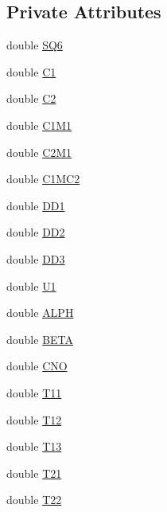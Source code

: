 \subsection*{Private Attributes}
\begin{DoxyCompactItemize}
\item 
double \hyperlink{classodes_1_1Radau5cc_ab72c18864827bc09b414a8c01e956698}{S\-Q6}
\item 
double \hyperlink{classodes_1_1Radau5cc_ad1df67bebb6c9753e789643dbbac4b64}{C1}
\item 
double \hyperlink{classodes_1_1Radau5cc_a4c4e52ad2bb85b6e3a598b75aecbdad8}{C2}
\item 
double \hyperlink{classodes_1_1Radau5cc_a1cf578a3f19e8e43321e182c46f710f4}{C1\-M1}
\item 
double \hyperlink{classodes_1_1Radau5cc_ab2b14b1062b5fb6dde7557fbac202c29}{C2\-M1}
\item 
double \hyperlink{classodes_1_1Radau5cc_a9d7ed1a3ffb2f3c582e1790e65f24671}{C1\-M\-C2}
\item 
double \hyperlink{classodes_1_1Radau5cc_a9a211ff738351641da6cdd159917fef2}{D\-D1}
\item 
double \hyperlink{classodes_1_1Radau5cc_a86933b385c18f7ff7072da61f03daf05}{D\-D2}
\item 
double \hyperlink{classodes_1_1Radau5cc_a1c94a1f803b67e35bbed88d6152d1fff}{D\-D3}
\item 
double \hyperlink{classodes_1_1Radau5cc_ae23acdd71ce8640aa40e111b4df06922}{U1}
\item 
double \hyperlink{classodes_1_1Radau5cc_a42e13c53f1b12eee97f358a2913f8e4f}{A\-L\-P\-H}
\item 
double \hyperlink{classodes_1_1Radau5cc_aca32380625f370758068d4c225958cd1}{B\-E\-T\-A}
\item 
double \hyperlink{classodes_1_1Radau5cc_aaa49f4e7f5289a7012e2ce29d2a7dab8}{C\-N\-O}
\item 
double \hyperlink{classodes_1_1Radau5cc_a3538e815c4a1a4449692ef7cf5331fcc}{T11}
\item 
double \hyperlink{classodes_1_1Radau5cc_ac47257f4b685d8016d8bdc0aaf6c3861}{T12}
\item 
double \hyperlink{classodes_1_1Radau5cc_a49b429abb614b8d4f41e6df611a12c06}{T13}
\item 
double \hyperlink{classodes_1_1Radau5cc_a5933359813b622b1dd1f67605df31521}{T21}
\item 
double \hyperlink{classodes_1_1Radau5cc_a1c4adb6f7b47032fe75bd53884a37ef3}{T22}
\item 

\end{DoxyCompactItemize}
